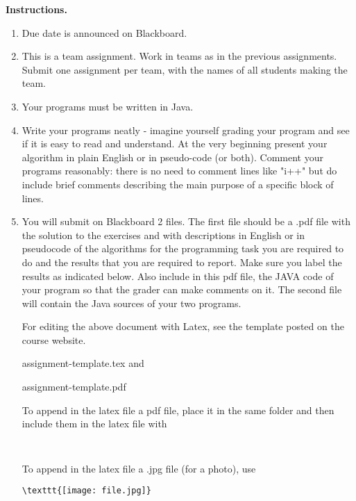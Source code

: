 \documentclass[11pt]{article}
\begin{document}
\textbf{Instructions.}
\begin{enumerate}
\item Due date is announced on Blackboard.
\item This is a team assignment. Work in teams as in the previous assignments.  Submit one assignment per team, with the names of all students making the team.
\item Your programs must be written in Java.
\item Write your programs neatly - imagine yourself grading your program and see if it is easy to read and understand. 
At the very beginning present your algorithm in plain English or in pseudo-code (or both).
Comment your programs reasonably: there is no need to comment lines like "i++" but do include brief comments describing the main purpose of a specific block of lines.
\item  You will submit on Blackboard 2 files. The first file should be a .pdf file  with the solution to the exercises  and with  descriptions in English or in pseudocode of the algorithms  for the  programming task  you are required to do and the results that you are required to report.
Make sure you label the results as indicated below.   Also include in this pdf file, the JAVA code of your program so that the grader can make comments on it.
The second file  will contain  the  Java sources of your two programs.






For editing the above document with  Latex, see the template posted on the course website. 
 
           assignment-template.tex	and
           
          assignment-template.pdf


To append in the  latex file  a pdf file, place it  in the same folder and then include them  in the latex file with 
\begin{verbatim}


\end{verbatim}
To append in the  latex file a .jpg file (for a photo), use 
\begin{verbatim}
\texttt{[image: file.jpg]}

\end{verbatim}



\end{enumerate}
\newpage
\fi
\end{document}

